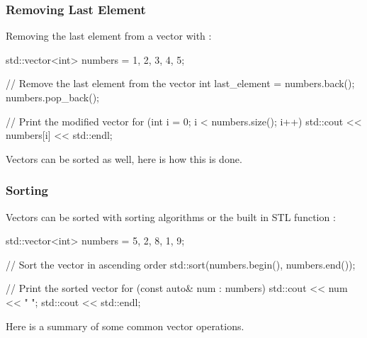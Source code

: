 \begin{highlight}

\subsubsection*{Removing Last Element}

Removing the last element from a vector with :

\begin{code}
std::vector<int> numbers = {1, 2, 3, 4, 5};

// Remove the last element from the vector
int last_element = numbers.back();
numbers.pop_back();

// Print the modified vector
for (int i = 0; i < numbers.size(); i++) {
    std::cout << numbers[i] << std::endl;
}
\end{code}

\end{highlight}

Vectors can be sorted as well, here is how this is done.

\begin{highlight}

\subsubsection*{Sorting}

Vectors can be sorted with sorting algorithms or the built in STL function :

\begin{code}
std::vector<int> numbers = {5, 2, 8, 1, 9};

// Sort the vector in ascending order
std::sort(numbers.begin(), numbers.end());

// Print the sorted vector
for (const auto& num : numbers) {
    std::cout << num << " ";
}
std::cout << std::endl;
\end{code}

\end{highlight}

Here is a summary of some common vector operations.

